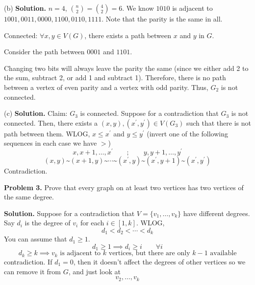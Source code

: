 (b) \textbf{Solution.} $ n=4 $, $ \binom{n}{2}=\binom{4}{2}=6 $.
We know $ 1010 $ is adjacent to $ 1001,0011,0000,1100,0110,1111 $.
Note that the parity is the same in all.

Connected: $ \forall x,y\in V(G) $, there exists a path between
$ x $ and $ y $ in $ G $.

Consider the path between $ 0001 $ and $ 1101 $.

Changing two bits will always leave the parity the same (since we either add 2
to the sum, subtract 2, or add 1 and subtract 1). Therefore, there is no path
between a vertex of even parity and a vertex with odd
parity. Thus, $ G_2 $ is not connected.

(c) \textbf{Solution.} Claim: $ G_3 $ is connected. Suppose for a contradiction that $ G_3 $
is not connected. Then, there exists a $ (x,y),(x^\prime,y^\prime)\in V(G_3) $
such that there is not path between them. WLOG, $ x\leqslant x^\prime $
and $ y\leqslant y^\prime $ (invert one of the following sequences
in each case we have $ > $)
\[ x,x+1,\ldots ,x^\prime \qquad;\qquad y,y+1,\ldots ,y^\prime \]
\[ (x,y)\text{\textasciitilde}(x+1,y)
    \text{\textasciitilde}
    \cdots
    \text{\textasciitilde}
    (x^\prime,y)
    \text{\textasciitilde}
    (x^\prime,y+1)
    \text{\textasciitilde}
    (x^\prime,y^\prime) \]
Contradiction.

\textbf{Problem 3.} Prove that every graph on at least two vertices
has two vertices of the same degree.

\textbf{Solution.} Suppose for a contradiction that
$ V=\{v_1,\ldots ,v_k\} $ have different degrees. Say $ d_i $
is the degree of $ v_i $ for each $ i\in[1,k] $. WLOG,
\[ d_1<d_2<\cdots<d_k \]
You can assume that $ d_1\geqslant 1 $.
\[ d_1\geqslant 1 \implies d_i\geqslant i\qquad \forall i \]
\[ d_k\geqslant k \implies v_k\text{ is adjacent to $k$ vertices, but there are only
        $k-1$ available} \]
contradiction. If $ d_1=0 $, then it doesn't affect the degrees
of other vertices so we can remove it from $ G $, and just look at
\[ v_2,\ldots,v_k \]

